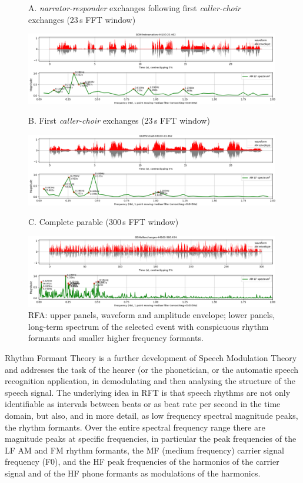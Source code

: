 \documentclass[output=paper,colorlinks,citecolor=brown
]{langscibook}
\begin{document}
\begin{figure}[ht]
\centering
{\footnotesize A. \textit{narrator-responder} exchanges following first \textit{caller-choir} exchanges (23\,s FFT window)}

\includegraphics[width=0.99\textwidth]{gibbon_figure06A.png}

{\footnotesize B. First \textit{caller-choir} exchanges (23\,s FFT window)}

\includegraphics[width=0.99\textwidth]{gibbon_figure06B.png}

{\footnotesize C. Complete parable (300\,s FFT window)}

\includegraphics[width=0.99\textwidth]{gibbon_figure06C.png}
\caption{\label{fig:fig06}RFA: upper panels, waveform and amplitude envelope; lower panels, long-term spectrum of the selected event with conspicuous rhythm formants and smaller higher frequency formants.}
\end{figure}
\noindent
Rhythm Formant Theory is a further development of Speech Modulation Theory and addresses the task of the hearer (or the phonetician, or the automatic speech recognition application, in demodulating and then analysing the structure of the speech signal. The underlying idea in RFT \cite{gibbonsp2018, gibbonjipa2021, gibbonsp2022} is that speech rhythms are not only identifiable as intervals between beats or as beat rate per second in the time domain, but also, and in more detail, as low frequency spectral magnitude peaks, the rhythm formants. Over the entire spectral frequency range there are magnitude peaks at specific frequencies, in particular the peak frequencies of the LF AM and FM rhythm formants, the MF (medium frequency) carrier signal frequency (F0), and the HF peak frequencies of the harmonics of the carrier signal and of the HF phone formants as modulations of the harmonics.
\end{document}
